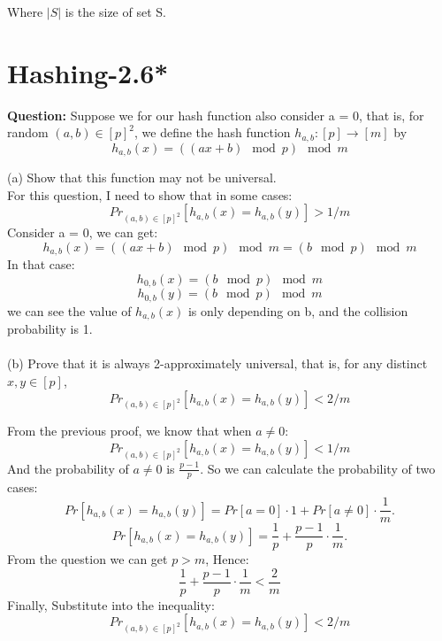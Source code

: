 \documentclass[12pt]{article}
\begin{document}
Where $|S|$ is the size of set S.

\section{Hashing-2.6*}
\textbf{Question:}
Suppose we for our hash function also consider a = 0, that is, for random \((a, b)\in[p]^2\), we define the hash function \(h_{a,b} : [p] \rightarrow [m]\) by
\[h_{a,b}(x) = ((ax + b)\mod{p} )\mod{m}\]

(a) Show that this function may not be universal.\\


For this question, I need to show that in some cases:
\[Pr_{(a,b)\in[p]^2}[h_{a,b}(x) = h_{a,b}(y)] > 1/m\]
Consider a = 0, we can get:
\[h_{a,b}(x) = ((ax + b)\mod{p} )\mod{m} = (b\mod{p} )\mod{m}\]
In that case:
\[h_{0,b}(x) = (b\mod{p} )\mod{m}\]
\[h_{0,b}(y) = (b\mod{p} )\mod{m}\]
we can see the value of \(h_{a,b}(x)\) is only depending on b, and the collision probability is 1.\\
\\
(b) Prove that it is always 2-approximately universal, that is, for any distinct \(x, y \in [p]\), 
\[Pr_{(a,b)\in[p]^2}[h_{a,b}(x) = h_{a,b}(y)] < 2/m\]


From the previous proof, we know that when \(a \neq 0\):
\[Pr_{(a,b)\in[p]^2}[h_{a,b}(x) = h_{a,b}(y)] < 1/m\]
And the probability of \(a \neq 0\) is \(\frac{p-1}{p}\).
So we can calculate the probability of two cases:
\[
Pr[h_{a,b}(x) = h_{a,b}(y)] = Pr[a = 0] \cdot 1 + Pr[a \neq 0] \cdot \frac{1}{m}.
\]
\[
Pr[h_{a,b}(x) = h_{a,b}(y)] = \frac{1}{p} + \frac{p-1}{p} \cdot \frac{1}{m}.
\]
From the question we can get \(p>m\), Hence:
\[\frac{1}{p} + \frac{p-1}{p} \cdot \frac{1}{m}<\frac{2}{m}\]
Finally, Substitute into the inequality:
\[Pr_{(a,b)\in[p]^2}[h_{a,b}(x) = h_{a,b}(y)] < 2/m\]



\end{document}
